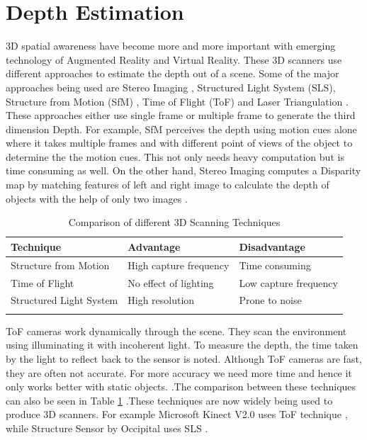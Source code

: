 \section{Depth Estimation}
3D spatial awareness have become more and more important with emerging technology of Augmented Reality and Virtual Reality. These 3D scanners use different approaches to estimate the depth out of a scene. Some of the major approaches being used are Stereo Imaging \cite{stereoimaging}, Structured Light System (SLS), Structure from Motion (SfM) \cite{sfm}, Time of Flight (ToF) \cite{timeofflight} and Laser Triangulation \cite{3DLasertechnique}. These approaches either use single frame or multiple frame to generate the third dimension Depth. For example, SfM perceives the depth using motion cues alone where it takes multiple frames and with different point of views of the object to determine the the motion cues\cite{sfm}. This not only needs heavy computation but is time consuming as well. On the other hand, Stereo Imaging computes a Disparity map by matching features of left and right image to calculate the depth of objects with the help of only two images \cite{stereoimaging}.

\begin{table}[h]
\begin{tabular}{@{}lll@{}}
\toprule
\textbf{Technique}                    & \textbf{Advantage}           & \textbf{Disadvantage}         \\ \midrule
Structure from Motion          & High capture frequency & Time consuming                 \\
Time of Flight       & No effect of lighting & Low capture frequency     \\
Structured Light System        & High resolution   & Prone to noise                 \\ 
                            &                     &                                               
\end{tabular}
\caption{Comparison of different 3D Scanning Techniques} 
\label{table:3DScanning}
\end{table}


ToF cameras work dynamically through the scene. They scan the environment using illuminating it with incoherent light. To measure the depth, the time taken by the light to reflect back to the sensor is noted. Although ToF cameras are fast, they are often not accurate. For more accuracy we need more time and hence it only works better with static objects. \cite{tof2}.The comparison between these techniques can also be seen in Table \ref{table:3DScanning} .These techniques are now widely being used to produce 3D scanners. For example Microsoft Kinect V2.0 uses ToF technique \cite{kinecttof}, while Structure Sensor by Occipital uses SLS \cite{Kalantari}.\\

